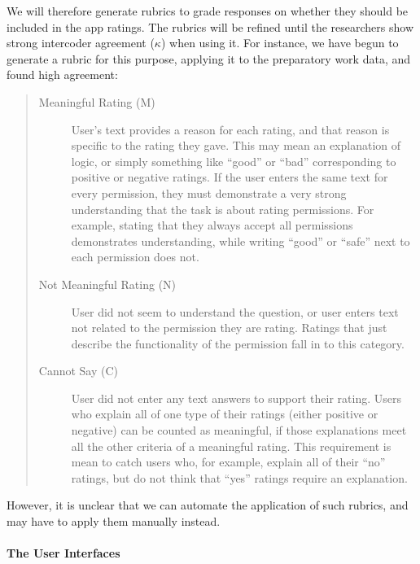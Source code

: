 \documentclass[11pt]{article}
\begin{document}
We will therefore generate rubrics to grade responses on whether they
should be included in the app ratings.  The rubrics will be refined
until the researchers show strong intercoder agreement ($\kappa$)
\cite{cohen-kappa-EPM60} when using it.  For instance, we have begun to generate a
rubric for this purpose, applying it to the preparatory work data, and
found high agreement:
\begin{quote}

\begin{description}

\item[Meaningful Rating (M)]

  User's text provides a reason for each rating, and that reason is
  specific to the rating they gave. This may mean an explanation of
  logic, or simply something like ``good'' or ``bad'' corresponding to
  positive or negative ratings. If the user enters the same text for
  every permission, they must demonstrate a very strong understanding
  that the task is about rating permissions. For example, stating that
  they always accept all permissions demonstrates understanding, while
  writing ``good'' or ``safe'' next to each permission does not.

\item[Not Meaningful Rating (N)]

  User did not seem to understand the question, or user enters text
  not related to the permission they are rating. Ratings that just
  describe the functionality of the permission fall in to this
  category.

\item[Cannot Say (C)]

  User did not enter any text answers to support their rating. Users
  who explain all of one type of their ratings (either positive or
  negative) can be counted as meaningful, if those explanations meet
  all the other criteria of a meaningful rating. This requirement is
  mean to catch users who, for example, explain all of their ``no''
  ratings, but do not think that ``yes'' ratings require an
  explanation.

\end{description}

\end{quote}
However, it is unclear that we can automate the application of such
rubrics, and may have to apply them manually instead.

\paragraph{The User Interfaces}
\label{para-eval-ui}
\end{document}
